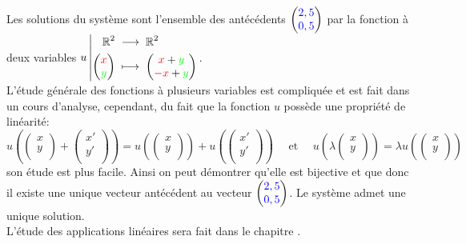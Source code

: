 \documentclass{book}
\begin{document}
Les solutions du système sont l'ensemble des antécédents $\begin{pmatrix}
 {\color{blue}2,5}   \\
 {\color{blue}0,5}  \\
\end{pmatrix}$ par la fonction à deux variables ${u}\left|\begin{aligned}{\mathbb{R}^2}&\;\longrightarrow\;{\mathbb{R}^2}\\{\begin{pmatrix}
  {\color{red}x}    \\
 {\color{green}y}   \\
\end{pmatrix}}&\;\longmapsto\;{\begin{pmatrix}
  {\color{red}x} +{\color{green}y}   \\
  {\color{red}-x} +{\color{green}y}   \\
\end{pmatrix}}\end{aligned}\right.$.\\
L'étude générale des fonctions à plusieurs variables est compliquée et est fait dans un cours d'analyse,  
cependant,  du fait que la fonction $u$ possède une propriété de linéarité:
 $$u(\begin{pmatrix}
 {x}    \\
{y}   \\
\end{pmatrix}+\begin{pmatrix}
 {x'}    \\
{y'}   \\
\end{pmatrix})=u(\begin{pmatrix}
 {x}    \\
{y}   \\
\end{pmatrix})+u(\begin{pmatrix}
 {x'}    \\
{y'}   \\
\end{pmatrix}) \quad\text{ et }\quad u(\lambda \begin{pmatrix}
 {x}    \\
{y}   \\
\end{pmatrix})=\lambda u(\begin{pmatrix}
 {x}    \\
{y}   \\
\end{pmatrix})$$
son étude est plus facile. Ainsi on peut démontrer qu'elle est bijective et que donc il existe une unique vecteur antécédent au vecteur $\begin{pmatrix}
 {\color{blue}2,5}   \\
 {\color{blue}0,5}  \\
\end{pmatrix}$. Le système admet une unique solution.\\
L'étude des applications linéaires sera fait dans le chapitre .




\end{document}
